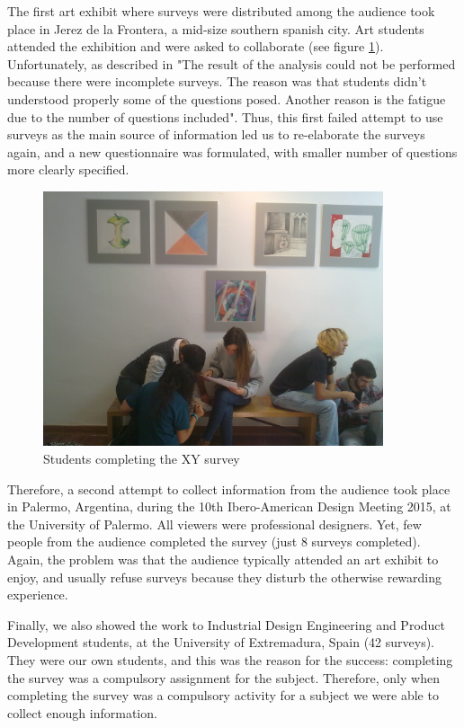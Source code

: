 \documentclass[graybox]{svmult}
\begin{document}
The first art exhibit where surveys were distributed among the audience took place in Jerez de la Frontera, a mid-size southern spanish city. Art students attended the exhibition and were asked to collaborate (see figure \ref{fig:survey}).  Unfortunately, as described in \cite{moreno2016analysing} "The result of the analysis could not be performed
because there were incomplete surveys. The reason was that
students didn't understood properly some of the questions
posed. Another reason is the fatigue due to the number of
questions included".  Thus, this first failed attempt to use surveys as the main source of information led us to re-elaborate the surveys again, and a new questionnaire was formulated,
with smaller number of questions more clearly specified.

\begin{figure}[t]
\centering 
\includegraphics[width=10cm]{img/survey.jpg}
\caption{Students completing the XY survey}
\label{fig:survey}       %
\end{figure}

Therefore, a second attempt to collect information from the audience took place in Palermo, Argentina, during the 10th
Ibero-American Design Meeting 2015, at the University of
Palermo. All viewers were professional designers.  Yet, few people from the audience completed the survey (just 8 surveys completed). Again, the problem was that the audience typically attended an art exhibit to enjoy, and usually refuse surveys because they disturb the otherwise rewarding experience.

Finally, we also showed the work to Industrial Design
Engineering and Product Development students, at the
University of Extremadura, Spain (42 surveys).  They were our own students, and this was the reason for the success:  completing the survey was a compulsory assignment for the subject.  Therefore, only when completing the survey was a compulsory activity for a subject we were able to collect enough information.
\end{document}

